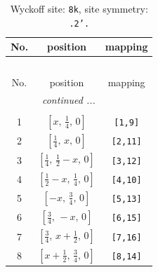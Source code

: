 \documentclass[fleqn,8pt]{jsarticle}
\begin{document}
\begin{longtable}{ccc}
\caption{Wyckoff site: {\tt 8k}, site symmetry: {\tt .2'.}}
 \\
 \hline \hline
No. & position & mapping \\ \hline \endfirsthead

\multicolumn{2}{l}{\tablename\ \thetable{}} \\
 \hline \hline
No. & position & mapping \\ \hline \endhead

 \hline \hline
\multicolumn{2}{r}{\footnotesize\it continued ...} \\ \endfoot

 \hline \hline
\multicolumn{2}{r}{} \\ \endlastfoot

1 & $\left[ x,\, \frac{1}{4},\, 0 \right]$ & {\tt [1,9]} \\ \hline
2 & $\left[ \frac{1}{4},\, x,\, 0 \right]$ & {\tt [2,11]} \\ \hline
3 & $\left[ \frac{1}{4},\, \frac{1}{2} - x,\, 0 \right]$ & {\tt [3,12]} \\ \hline
4 & $\left[ \frac{1}{2} - x,\, \frac{1}{4},\, 0 \right]$ & {\tt [4,10]} \\ \hline
5 & $\left[ - x,\, \frac{3}{4},\, 0 \right]$ & {\tt [5,13]} \\ \hline
6 & $\left[ \frac{3}{4},\, - x,\, 0 \right]$ & {\tt [6,15]} \\ \hline
7 & $\left[ \frac{3}{4},\, x + \frac{1}{2},\, 0 \right]$ & {\tt [7,16]} \\ \hline
8 & $\left[ x + \frac{1}{2},\, \frac{3}{4},\, 0 \right]$ & {\tt [8,14]} \\
\end{longtable}
\renewcommand{\arraystretch}{1.2}
\end{document}
